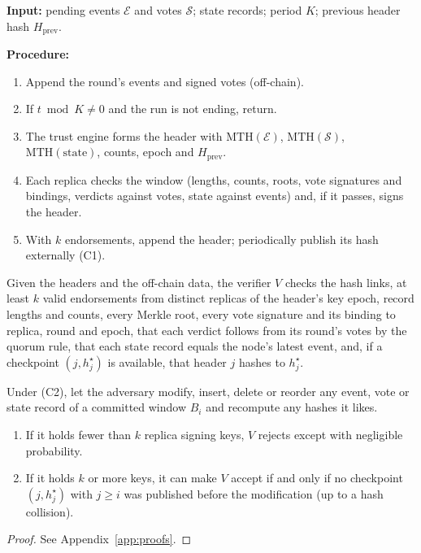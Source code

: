 \begin{algorithm}[!t]
\caption{Audit-log commit at round $t$.}
\label{alg:anchor}
\noindent\textbf{Input:} pending events $\mathcal{E}$ and votes
$\mathcal{S}$; state records; period $K$; previous header hash
$H_{\mathrm{prev}}$.

\noindent\textbf{Procedure:}
\begin{enumerate}\setlength{\itemsep}{0pt}\setlength{\parskip}{0pt}
  \item Append the round's events and signed votes (off-chain).
  \item If $t \bmod K \neq 0$ and the run is not ending, return.
  \item The trust engine forms the header with
        $\mathrm{MTH}(\mathcal{E})$, $\mathrm{MTH}(\mathcal{S})$,
        $\mathrm{MTH}(\text{state})$, counts, epoch and
        $H_{\mathrm{prev}}$.
  \item Each replica checks the window (lengths, counts, roots, vote
        signatures and bindings, verdicts against votes, state against
        events) and, if it passes, signs the header.
  \item With $k$ endorsements, append the header; periodically
        publish its hash externally (C1).
\end{enumerate}
\end{algorithm}

\begin{definition}[Verifier]
Given the headers and the off-chain data, the verifier $V$ checks the
hash links, at least $k$ valid endorsements from distinct replicas of
the header's key epoch, record lengths and counts, every Merkle root,
every vote signature and its binding to replica, round and epoch, that
each verdict follows from its round's votes by the quorum rule, that
each state record equals the node's latest event, and, if a checkpoint
$(j,h^{\star}_j)$ is available, that header $j$ hashes to $h^{\star}_j$.
\end{definition}

\begin{theorem}\label{thm:tamper}
Under (C2), let the adversary modify, insert, delete or reorder any
event, vote or state record of a committed window $B_i$ and recompute
any hashes it likes.
\begin{enumerate}
\item If it holds fewer than $k$ replica signing keys, $V$ rejects
except with negligible probability.
\item If it holds $k$ or more keys, it can make $V$ accept if and only
if no checkpoint $(j,h^{\star}_j)$ with $j\ge i$ was published before
the modification (up to a hash collision).
\end{enumerate}
\end{theorem}
\begin{proof}
See Appendix~\ref{app:proofs}.
\end{proof}

